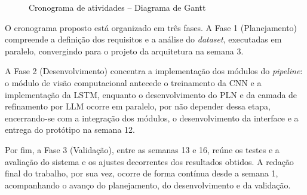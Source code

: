 \documentclass[
    12pt,                %
    openright,           %
    oneside,             %
    a4paper,             %
    english,             %
    brazil               %
]{abntex2}
\begin{document}
\begin{figure}[H]
{\begin{ganttchart}
 
        \end{ganttchart}
    }
    \caption{Cronograma de atividades -- Diagrama de Gantt}
\end{figure}
 
O cronograma proposto está organizado em três fases. A Fase 1 (Planejamento) compreende a definição dos requisitos e a análise do \textit{dataset}, executadas em paralelo, convergindo para o projeto da arquitetura na semana 3. 

A Fase 2 (Desenvolvimento) concentra a implementação dos módulos do \textit{pipeline}: o módulo de visão computacional antecede o treinamento da CNN e a implementação da LSTM, enquanto o desenvolvimento do PLN e da camada de refinamento por LLM ocorre em paralelo, por não depender dessa etapa, encerrando-se com a integração dos módulos, o desenvolvimento da interface e a entrega do protótipo na semana 12. 

Por fim, a Fase 3 (Validação), entre as semanas 13 e 16, reúne os testes e a avaliação do sistema e os ajustes decorrentes dos resultados obtidos. A redação final do trabalho, por sua vez, ocorre de forma contínua desde a semana 1, acompanhando o avanço do planejamento, do desenvolvimento e da validação.

\postextual

%
%
%
\end{document}

